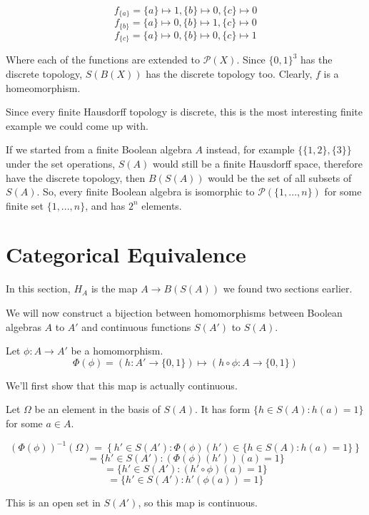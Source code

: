 \documentclass{article}
\begin{document}
        \[f_{\{a\}} = \{a\} \mapsto 1, \{b\} \mapsto 0, \{c\} \mapsto 0\]
        \[f_{\{b\}} = \{a\} \mapsto 0, \{b\} \mapsto 1, \{c\} \mapsto 0\]
        \[f_{\{c\}} = \{a\} \mapsto 0, \{b\} \mapsto 0, \{c\} \mapsto 1\]

        Where each of the functions are extended to $\mathcal{P}(X)$.
        Since $\{0,1\}^3$ has the discrete topology, $S(B(X))$ has the discrete
        topology too. Clearly, $f$ is a homeomorphism.

        Since every finite Hausdorff topology is discrete, this is the most
        interesting finite example we could come up with.

        If we started from a finite Boolean algebra $A$ instead, for example
        $\{\{1,2\},\{3\}\}$ under the set operations, $S(A)$ would still be a
        finite Hausdorff space, therefore have the discrete topology, then
        $B(S(A))$ would be the set of all subsets of $S(A)$. So, every finite
        Boolean algebra is isomorphic to $\mathcal{P}(\{1, ..., n\})$ for some
        finite set $\{1, ..., n\}$, and has $2^n$ elements.

    \section{Categorical Equivalence}

      In this section, $H_A$ is the map $A \to B(S(A))$ we found two sections
      earlier.

      We will now construct a bijection between homomorphisms between Boolean
      algebras $A$ to $A'$ and continuous functions $S(A')$ to $S(A)$.

      Let $\phi: A \to A'$ be a homomorphism.  \[\Phi(\phi) = (h : A'
      \rightarrow \{0,1\}) \mapsto (h \circ \phi : A \rightarrow \{0,1\})\]

      We'll first show that this map is actually continuous.

      Let $\Omega$ be an element in the basis of $S(A)$. It has form $\{h \in
      S(A): h(a) = 1\}$ for some $a \in A$.

      \[(\Phi(\phi))^{-1}(\Omega) = \left\{h' \in S(A') : \Phi(\phi)(h') \in \{h
      \in S(A): h(a) = 1\} \right\}\] \[ = \{h' \in S(A') : (\Phi(\phi)(h'))(a)
      = 1 \}\] \[ = \{h' \in S(A') : (h' \circ \phi)(a) = 1 \}\] \[ = \{h' \in
      S(A') : h'(\phi(a)) = 1\}\]

      This is an open set in $S(A')$, so this map is continuous.
\end{document}
